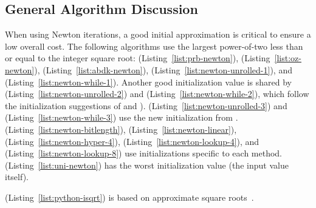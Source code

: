 \subsection{General Algorithm Discussion}

When using Newton iterations,
a good initial approximation is critical to ensure a low overall cost.
The following algorithms use the largest power-of-two less than or equal
to the integer square root:
\prb{} (Listing~\ref{list:prb-newton}),
\OpenZeppelin{} (Listing~\ref{list:oz-newton}),
\abdk{} (Listing~\ref{list:abdk-newton}),
\UnrolledOne{} (Listing~\ref{list:newton-unrolled-1}), and
\WhileOne{} (Listing~\ref{list:newton-while-1}).
Another good initialization value is shared by
\UnrolledTwo{} (Listing~\ref{list:newton-unrolled-2}) and
\WhileTwo{} (Listing~\ref{list:newton-while-2}),
which follow the initialization suggestions of
\cite[Chapter 1.7, Remarks (2)]{cohen1993} and
\cite[Algorithm 9.2.11]{PrimeNumbersACP2005}).
\UnrolledThree{} (Listing~\ref{list:newton-unrolled-3}) and
\WhileThree{} (Listing~\ref{list:newton-while-3})
use the new initialization from \cite{EfficientIsqrt}.
\BitLength{} (Listing~\ref{list:newton-bitlength}),
\Linear{} (Listing~\ref{list:newton-linear}),
\HyperFour{} (Listing~\ref{list:newton-hyper-4}),
\LookupFour{} (Listing~\ref{list:newton-lookup-4}), and
\LookupEight{} (Listing~\ref{list:newton-lookup-8})
use initializations specific to each method.
\Uniswap{} (Listing~\ref{list:uni-newton}) has the worst
initialization value (the input value itself).

\python{} (Listing~\ref{list:python-isqrt})
is based on approximate square roots~\cite{PythonIsqrt}.
